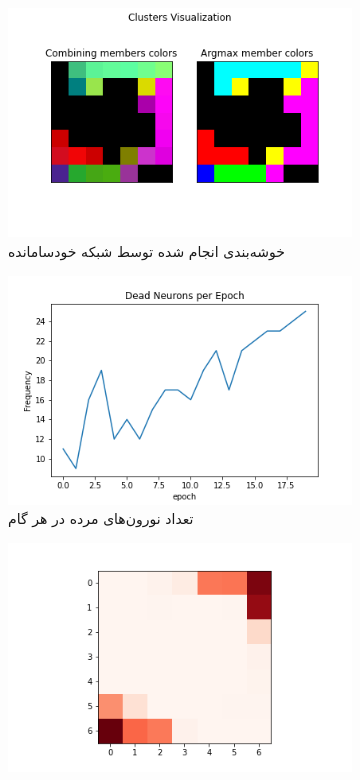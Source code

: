 \documentclass[12pt, a4paper]{article}
\begin{document}
\clearpage

\begin{figure}[h]
    \begin{subfigure}{\linewidth}
        \centering
        \includegraphics[width=0.8\linewidth]{images/q5/r9/cluster.png}
        \caption{خوشه‌بندی انجام شده توسط شبکه خودسامانده}
    \end{subfigure}
    \newline
    \begin{subfigure}{0.45\linewidth}
        \includegraphics[width=\linewidth]{images/q5/r9/dead.png}
        \caption{تعداد نورون‌های مرده در هر گام}
    \end{subfigure}
    \hfill
    \begin{subfigure}{0.45\linewidth}
        \includegraphics[width=\linewidth]{images/q5/r9/umatrix.png}

\end{subfigure}
\end{figure}
\end{document}
